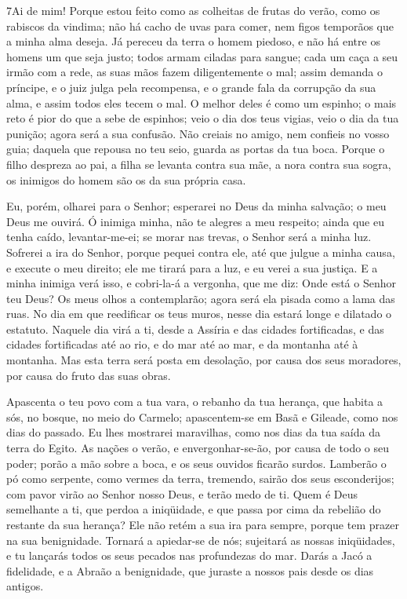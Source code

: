\medskip

\lettrine{7} Ai de mim! Porque estou feito como as colheitas
de frutas do verão, como os rabiscos da vindima; não há cacho de
uvas para comer, nem figos temporãos que a minha alma deseja. Já
pereceu da terra o homem piedoso, e não há entre os homens um que
seja justo; todos armam ciladas para sangue; cada um caça a seu
irmão com a rede, as suas mãos fazem diligentemente o mal; assim
demanda o príncipe, e o juiz julga pela recompensa, e o grande fala
da corrupção da sua alma, e assim todos eles tecem o mal. O
melhor deles é como um espinho; o mais reto é pior do que a sebe de
espinhos; veio o dia dos teus vigias, veio o dia da tua punição;
agora será a sua confusão. Não creiais no amigo, nem confieis no
vosso guia; daquela que repousa no teu seio, guarda as portas da tua
boca. Porque o filho despreza ao pai, a filha se levanta contra
sua mãe, a nora contra sua sogra, os inimigos do homem são os da sua
própria casa.

Eu, porém, olharei para o Senhor; esperarei no Deus da minha
salvação; o meu Deus me ouvirá. Ó inimiga minha, não te alegres
a meu respeito; ainda que eu tenha caído, levantar-me-ei; se morar
nas trevas, o Senhor será a minha luz. Sofrerei a ira do Senhor,
porque pequei contra ele, até que julgue a minha causa, e execute o
meu direito; ele me tirará para a luz, e eu verei a sua justiça.
E a minha inimiga verá isso, e cobri-la-á a vergonha, que me
diz: Onde está o Senhor teu Deus? Os meus olhos a contemplarão;
agora será ela pisada como a lama das ruas. No dia em que
reedificar os teus muros, nesse dia estará longe e dilatado o
estatuto. Naquele dia virá a ti, desde a Assíria e das
cidades fortificadas, e das cidades fortificadas até ao rio, e do
mar até ao mar, e da montanha até à montanha. Mas esta terra
será posta em desolação, por causa dos seus moradores, por causa do
fruto das suas obras.

Apascenta o teu povo com a tua vara, o rebanho da tua herança,
que habita a sós, no bosque, no meio do Carmelo; apascentem-se em
Basã e Gileade, como nos dias do passado. Eu lhes mostrarei
maravilhas, como nos dias da tua saída da terra do Egito. As
nações o verão, e envergonhar-se-ão, por causa de todo o seu poder;
porão a mão sobre a boca, e os seus ouvidos ficarão surdos.
Lamberão o pó como serpente, como vermes da terra, tremendo,
sairão dos seus esconderijos; com pavor virão ao Senhor nosso Deus,
e terão medo de ti. Quem é Deus semelhante a ti, que perdoa a
iniqüidade, e que passa por cima da rebelião do restante da sua
herança? Ele não retém a sua ira para sempre, porque tem prazer na
sua benignidade. Tornará a apiedar-se de nós; sujeitará as
nossas iniqüidades, e tu lançarás todos os seus pecados nas
profundezas do mar. Darás a Jacó a fidelidade, e a Abraão a
benignidade, que juraste a nossos pais desde os dias antigos.


